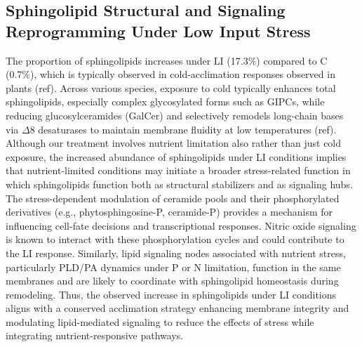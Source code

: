 \documentclass[10pt,letterpaper]{article}
\begin{document}
\subsection*{Sphingolipid Structural and Signaling Reprogramming Under Low Input Stress}
The proportion of sphingolipids increases under LI (17.3\%) compared to C (0.7\%), which is typically observed in cold-acclimation responses observed in plants (ref). Across various species, exposure to cold typically enhances total sphingolipids, especially complex glycosylated forms such as GIPCs, while reducing glucosylceramides (GalCer) and selectively remodels long-chain bases via $\Delta$8 desaturases to maintain membrane fluidity at low temperatures (ref). Although our treatment involves nutrient limitation also rather than just cold exposure, the increased abundance of sphingolipids under LI conditions implies that nutrient-limited conditions may initiate a broader stress-related function in which sphingolipids function both as structural stabilizers and as signaling hubs. The stress-dependent modulation of ceramide pools and their phosphorylated derivatives (e.g., phytosphingosine-P, ceramide-P) provides a mechanism for influencing cell-fate decisions and transcriptional responses. Nitric oxide signaling is known to interact with these phosphorylation cycles and could contribute to the LI response. Similarly, lipid signaling nodes associated with nutrient stress, particularly PLD/PA dynamics under P or N limitation, function in the same membranes and are likely to coordinate with sphingolipid homeostasis during remodeling. Thus, the observed increase in sphingolipids under LI conditions aligns with a conserved acclimation strategy enhancing membrane integrity and modulating lipid-mediated signaling to reduce the effects of stress while integrating nutrient-responsive pathways. 
\end{document}
